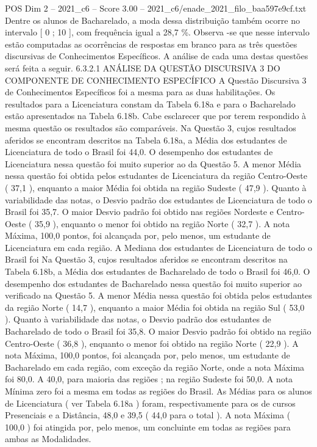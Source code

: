 \begin{textsample}{POS Dim 2 – 2021\_c6 – Score 3.00 – 2021\_c6/enade\_2021\_filo\_baa597e9cf.txt}
Dentre os alunos de Bacharelado, a moda dessa distribuição também ocorre no intervalo [ 0 ; 10 ], com frequência igual a 28,7 \%.
Observa -se que nesse intervalo estão computadas as ocorrências de respostas em branco para as três questões discursivas de Conhecimentos Específicos.
A análise de cada uma destas questões será feita a seguir. 6.3.2.1 ANÁLISE DA QUESTÃO DISCURSIVA 3 DO COMPONENTE DE CONHECIMENTO ESPECÍFICO A Questão Discursiva 3 de Conhecimentos Específicos foi a mesma para as duas habilitações.
Os resultados para a Licenciatura constam da Tabela 6.18a e para o Bacharelado estão apresentados na Tabela 6.18b.
Cabe esclarecer que por terem respondido à mesma questão os resultados são comparáveis.
Na Questão 3, cujos resultados aferidos se encontram descritos na Tabela 6.18a, a Média dos estudantes de Licenciatura de todo o Brasil foi 44,0.
O desempenho dos estudantes de Licenciatura nessa questão foi muito superior ao da Questão 5.
A menor Média nessa questão foi obtida pelos estudantes de Licenciatura da região Centro-Oeste ( 37,1 ), enquanto a maior Média foi obtida na região Sudeste ( 47,9 ).
Quanto à variabilidade das notas, o Desvio padrão dos estudantes de Licenciatura de todo o Brasil foi 35,7.
O maior Desvio padrão foi obtido nas regiões Nordeste e Centro-Oeste ( 35,9 ), enquanto o menor foi obtido na região Norte ( 32,7 ).
A nota Máxima, 100,0 pontos, foi alcançada por, pelo menos, um estudante de Licenciatura em cada região.
A Mediana dos estudantes de Licenciatura de todo o Brasil foi Na Questão 3, cujos resultados aferidos se encontram descritos na Tabela 6.18b, a Média dos estudantes de Bacharelado de todo o Brasil foi 46,0.
O desempenho dos estudantes de Bacharelado nessa questão foi muito superior ao verificado na Questão 5.
A menor Média nessa questão foi obtida pelos estudantes da região Norte ( 14,7 ), enquanto a maior Média foi obtida na região Sul ( 53,0 ).
Quanto à variabilidade das notas, o Desvio padrão dos estudantes de Bacharelado de todo o Brasil foi 35,8.
O maior Desvio padrão foi obtido na região Centro-Oeste ( 36,8 ), enquanto o menor foi obtido na região Norte ( 22,9 ).
A nota Máxima, 100,0 pontos, foi alcançada por, pelo menos, um estudante de Bacharelado em cada região, com exceção da região Norte, onde a nota Máxima foi 80,0.
A 40,0, para maioria das regiões ; na região Sudeste foi 50,0.
A nota Mínima zero foi a mesma em todas as regiões do Brasil.
As Médias para os alunos de Licenciatura ( ver Tabela 6.18a ) foram, respectivamente para os de cursos Presenciais e a Distância, 48,0 e 39,5 ( 44,0 para o total ).
A nota Máxima ( 100,0 ) foi atingida por, pelo menos, um concluinte em todas as regiões para ambas as Modalidades.

\end{textsample}
